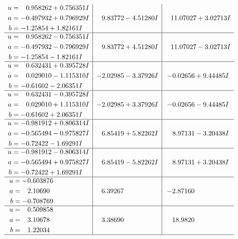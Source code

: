 \documentclass[1p]{elsarticle_modified}
\theoremstyle{definition}
\begin{document}
$$\begin{array}{c|c|c}
\begin{aligned}
u &= \phantom{-}0.958262 + 0.756351 I \\
a &= -0.497932 + 0.796929 I \\
b &= -1.25854 + 1.82161 I\end{aligned}
 & \phantom{-}9.83772 - 4.51280 I & \phantom{-}11.07027 + 3.02713 I \\ \hline\begin{aligned}
u &= \phantom{-}0.958262 - 0.756351 I \\
a &= -0.497932 - 0.796929 I \\
b &= -1.25854 - 1.82161 I\end{aligned}
 & \phantom{-}9.83772 + 4.51280 I & \phantom{-}11.07027 - 3.02713 I \\ \hline\begin{aligned}
u &= \phantom{-}0.632431 + 0.395728 I \\
a &= \phantom{-}0.029010 - 1.115310 I \\
b &= -0.61602 - 2.06351 I\end{aligned}
 & -2.02985 - 3.37926 I & -0.02656 + 9.44485 I \\ \hline\begin{aligned}
u &= \phantom{-}0.632431 - 0.395728 I \\
a &= \phantom{-}0.029010 + 1.115310 I \\
b &= -0.61602 + 2.06351 I\end{aligned}
 & -2.02985 + 3.37926 I & -0.02656 - 9.44485 I \\ \hline\begin{aligned}
u &= -0.981912 + 0.806314 I \\
a &= -0.565494 - 0.975827 I \\
b &= -0.72422 - 1.69291 I\end{aligned}
 & \phantom{-}6.85419 + 5.82262 I & \phantom{-}8.97131 - 3.20438 I \\ \hline\begin{aligned}
u &= -0.981912 - 0.806314 I \\
a &= -0.565494 + 0.975827 I \\
b &= -0.72422 + 1.69291 I\end{aligned}
 & \phantom{-}6.85419 - 5.82262 I & \phantom{-}8.97131 + 3.20438 I \\ \hline\begin{aligned}
u &= -0.603876\phantom{ +0.000000I} \\
a &= \phantom{-}2.10690\phantom{ +0.000000I} \\
b &= -0.708769\phantom{ +0.000000I}\end{aligned}
 & \phantom{-}6.39267\phantom{ +0.000000I} & -2.87160\phantom{ +0.000000I} \\ \hline\begin{aligned}
u &= \phantom{-}0.509858\phantom{ +0.000000I} \\
a &= \phantom{-}3.10678\phantom{ +0.000000I} \\
b &= \phantom{-}1.22034\phantom{ +0.000000I}\end{aligned}
 & \phantom{-}3.38690\phantom{ +0.000000I} & \phantom{-}18.9820\phantom{ +0.000000I}\\
 \hline 
 \end{array}$$\newpage
\end{document}

